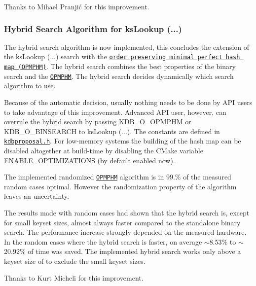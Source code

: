Thanks to Mihael Pranjić for this improvement.

\subsubsection*{Hybrid Search Algorithm for {\ttfamily ks\+Lookup (...)}}

The hybrid search algorithm is now implemented, this concludes the extension of the {\ttfamily ks\+Lookup (...)} search with the \href{https://master.libelektra.org/doc/dev/data-structures.md#order-preserving-minimal-perfect-hash-map-aka-opmphm}{\tt order preserving minimal perfect hash map (O\+P\+M\+P\+HM)}. The hybrid search combines the best properties of the binary search and the \href{https://master.libelektra.org/doc/dev/data-structures.md#order-preserving-minimal-perfect-hash-map-aka-opmphm}{\tt O\+P\+M\+P\+HM}. The hybrid search decides dynamically which search algorithm to use.

Because of the automatic decision, usually nothing needs to be done by A\+PI users to take advantage of this improvement. Advanced A\+PI user, however, can overrule the hybrid search by passing {\ttfamily K\+D\+B\+\_\+\+O\+\_\+\+O\+P\+M\+P\+HM} or {\ttfamily K\+D\+B\+\_\+\+O\+\_\+\+B\+I\+N\+S\+E\+A\+R\+CH} to {\ttfamily ks\+Lookup (...)}. The constants are defined in \href{https://master.libelektra.org/src/include/kdbproposal.h}{\tt kdbproposal.\+h}. For low-\/memory systems the building of the hash map can be disabled altogether at build-\/time by disabling the C\+Make variable {\ttfamily E\+N\+A\+B\+L\+E\+\_\+\+O\+P\+T\+I\+M\+I\+Z\+A\+T\+I\+O\+NS} (by default enabled now).

The implemented randomized \href{https://master.libelektra.org/doc/dev/data-structures.md#order-preserving-minimal-perfect-hash-map-aka-opmphm}{\tt O\+P\+M\+P\+HM} algorithm is in 99.\% of the measured random cases optimal. However the randomization property of the algorithm leaves an uncertainty.

The results made with random cases had shown that the hybrid search is, except for small keyset sizes, almost always faster compared to the standalone binary search. The performance increase strongly depended on the measured hardware. In the random cases where the hybrid search is faster, on average $\sim$8.53\% to $\sim$20.92\% of time was saved. The implemented hybrid search works only above a keyset size of {} to exclude the small keyset sizes.

Thanks to Kurt Micheli for this improvement.


